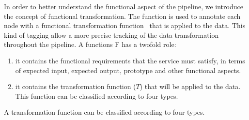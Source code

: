 In order to better understand the functional aspect of the pipeline, we introduce the concept of functional transformation.
The \myGamma function is used to annotate each node with a functional transformation function \TF\ that is applied to the data.
This kind of tagging allow a more precise tracking of the data transformation throughout the pipeline.
A functions F has a twofold role:
\begin{enumerate}[label=\roman*)]
  \item it contains the functional requirements that the service must satisfy, in terms of expected input, expected output, prototype and other functional aspects.
  \item it contains the transformation function ($T$) that will be applied to the data. This function can be classified according to four types.
\end{enumerate}
A transformation function can be classified according to four types.

